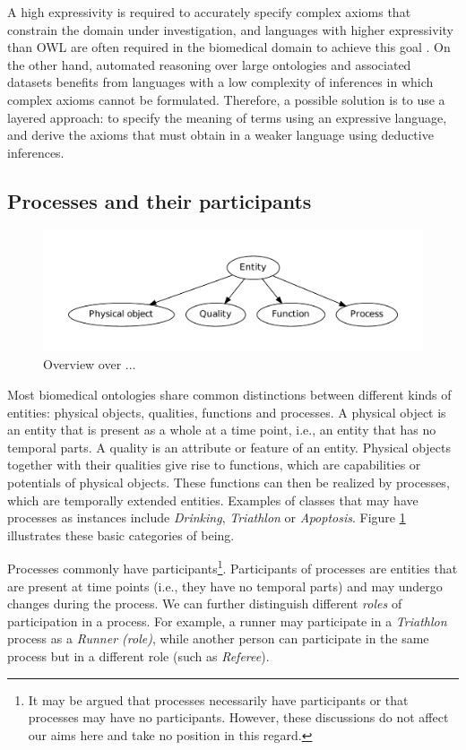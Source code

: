 \documentclass{bioinfo}
\renewcommand{\cite}{\citep}
\begin{document}
A high expressivity is required to accurately specify complex axioms
that constrain the domain under investigation, and languages with
higher expressivity than OWL are often required in the biomedical
domain to achieve this goal \cite{Hoehndorf2009sequences, rnao}. On
the other hand, automated reasoning over large ontologies and
associated datasets benefits from languages with a low complexity of
inferences in which complex axioms cannot be formulated. Therefore, a
possible solution is to use a layered approach: to specify the meaning
of terms using an expressive language, and derive the axioms that
must obtain in a weaker language using deductive inferences.

\subsection{Processes and their participants}
\begin{figure}
  \centering
  \includegraphics[width=.45\textwidth]{onto.pdf}
  \caption{Overview over ...\label{fig:onto}}
\end{figure}

Most biomedical ontologies share common distinctions between different
kinds of entities: physical objects, qualities, functions and
processes. A physical object is an entity that is present as a whole
at a time point, i.e., an entity that has no temporal parts. A quality
is an attribute or feature of an entity. Physical objects together
with their qualities give rise to functions, which are capabilities or
potentials of physical objects. These functions can then be realized
by processes, which are temporally extended entities. Examples of
classes that may have processes as instances include {\em Drinking},
{\em Triathlon} or {\em Apoptosis}.  Figure \ref{fig:onto} illustrates
these basic categories of being.

Processes commonly have participants\footnote{It may be argued that
  processes necessarily have participants or that processes may have
  no participants. However, these discussions do not affect our aims
  here and take no position in this regard.}. Participants of
processes are entities that are present at time points (i.e., they
have no temporal parts) and may undergo changes during the process.
We can further distinguish different {\em roles} of participation in a
process. For example, a runner may participate in a {\em Triathlon}
process as a {\em Runner (role)}, while another person can participate
in the same process but in a different role (such as {\em Referee}).
\end{document}
